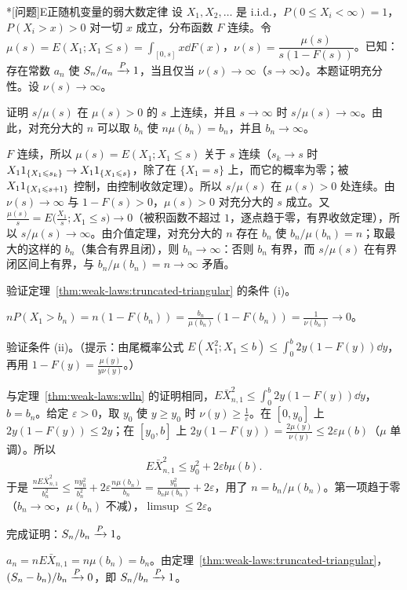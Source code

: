 \begin{probleme}*[问题]{E}{正随机变量的弱大数定律}
设 $X_1,X_2,\dots$ 是 i.i.d.，$P(0\leqslant X_i<\infty)=1$，$P(X_i>x)>0$ 对一切 $x$ 成立，分布函数 $F$ 连续。令 $\mu(s)=E(X_1;X_1\leqslant s)=\int_{[0,s]}x\dd F(x)$，$\nu(s)=\dfrac{\mu(s)}{s(1-F(s))}$。已知：存在常数 $a_n$ 使 $S_n/a_n\xrightarrow{P}1$，当且仅当 $\nu(s)\to\infty$（$s\to\infty$）。本题证明充分性。设 $\nu(s)\to\infty$。
\begin{questions}
\item 证明 $s/\mu(s)$ 在 $\mu(s)>0$ 的 $s$ 上连续，并且 $s\to\infty$ 时 $s/\mu(s)\to\infty$。由此，对充分大的 $n$ 可以取 $b_n$ 使 $n\mu(b_n)=b_n$，并且 $b_n\to\infty$。
\begin{solution}
$F$ 连续，所以 $\mu(s)=E(X_1;X_1\leqslant s)$ 关于 $s$ 连续（$s_k\to s$ 时 $X_11_{\{X_1\leqslant s_k\}}\to X_11_{\{X_1\leqslant s\}}$，除了在 $\{X_1=s\}$ 上，而它的概率为零；被 $X_11_{\{X_1\leqslant s+1\}}$ 控制，由控制收敛定理）。所以 $s/\mu(s)$ 在 $\mu(s)>0$ 处连续。由 $\nu(s)\to\infty$ 与 $1-F(s)>0$，$\mu(s)>0$ 对充分大的 $s$ 成立。又 $\frac{\mu(s)}s=E\bigl(\frac{X_1}s;X_1\leqslant s\bigr)\to0$（被积函数不超过 $1$，逐点趋于零，有界收敛定理），所以 $s/\mu(s)\to\infty$。由介值定理，对充分大的 $n$ 存在 $b_n$ 使 $b_n/\mu(b_n)=n$；取最大的这样的 $b_n$（集合有界且闭），则 $b_n\to\infty$：否则 $b_n$ 有界，而 $s/\mu(s)$ 在有界闭区间上有界，与 $b_n/\mu(b_n)=n\to\infty$ 矛盾。
\end{solution}
\item 验证定理~\ref{thm:weak-laws:truncated-triangular} 的条件 (i)。
\begin{solution}
$nP(X_1>b_n)=n(1-F(b_n))=\frac{b_n}{\mu(b_n)}(1-F(b_n))=\frac1{\nu(b_n)}\to0$。
\end{solution}
\item 验证条件 (ii)。（提示：由尾概率公式 $E(X_1^2;X_1\leqslant b)\leqslant\int_0^b2y(1-F(y))\dd y$，再用 $1-F(y)=\frac{\mu(y)}{y\nu(y)}$。）
\begin{solution}
与定理~\ref{thm:weak-laws:wlln} 的证明相同，$E\bar X_{n,1}^2\leqslant\int_0^{b}2y(1-F(y))\dd y$，$b=b_n$。给定 $\varepsilon>0$，取 $y_0$ 使 $y\geqslant y_0$ 时 $\nu(y)\geqslant\frac1\varepsilon$。在 $[0,y_0]$ 上 $2y(1-F(y))\leqslant2y$；在 $[y_0,b]$ 上 $2y(1-F(y))=\frac{2\mu(y)}{\nu(y)}\leqslant2\varepsilon\mu(b)$（$\mu$ 单调）。所以
\[
E\bar X_{n,1}^2\leqslant y_0^2+2\varepsilon b\mu(b).
\]
于是 $\frac{nE\bar X_{n,1}^2}{b_n^2}\leqslant\frac{ny_0^2}{b_n^2}+2\varepsilon\frac{n\mu(b_n)}{b_n}=\frac{y_0^2}{b_n\mu(b_n)}+2\varepsilon$，用了 $n=b_n/\mu(b_n)$。第一项趋于零（$b_n\to\infty$，$\mu(b_n)$ 不减），$\limsup\leqslant2\varepsilon$。
\end{solution}
\item 完成证明：$S_n/b_n\xrightarrow{P}1$。
\begin{solution}
$a_n=nE\bar X_{n,1}=n\mu(b_n)=b_n$。由定理~\ref{thm:weak-laws:truncated-triangular}，$(S_n-b_n)/b_n\xrightarrow{P}0$，即 $S_n/b_n\xrightarrow{P}1$。


\end{solution}
\end{questions}
\end{probleme}
